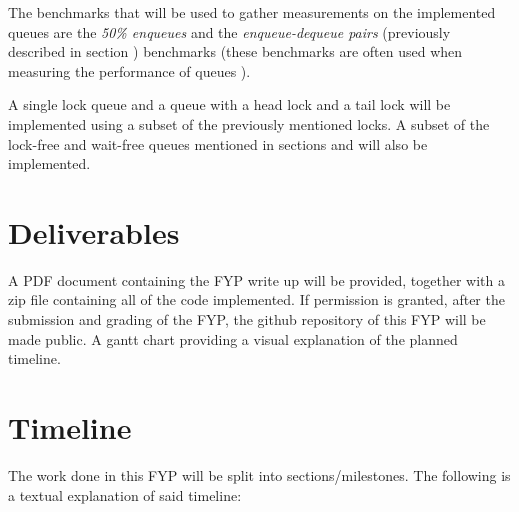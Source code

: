 \documentclass[a4paper, 12pt, titlepage]{article}
\begin{document}
\begin{singlespace}
The benchmarks that will be used to gather measurements on the implemented queues are the \emph{50\% enqueues} and the \emph{enqueue-dequeue pairs} (previously described in section ) benchmarks (these benchmarks are often used when measuring the performance of queues \cite{kogan2011wait,hoffman2007baskets,ladan2004optimistic}).

A single lock queue and a queue with a head lock and a tail lock will be implemented using a subset of the previously mentioned locks. A subset of the lock-free and wait-free queues mentioned in sections  and  will also be implemented.

\section{Deliverables}
A PDF document containing the FYP write up will be provided, together with a zip file containing all of the code implemented. If permission is granted, after the submission and grading of the FYP, the github repository of this FYP will be made public. A gantt chart providing a visual explanation of the planned timeline.

\section{Timeline}
The work done in this FYP will be split into sections/milestones. The following is a textual explanation of said timeline:


\end{singlespace}
\end{document}
